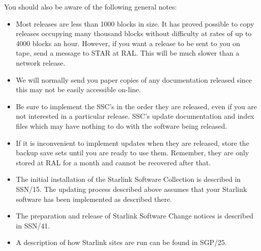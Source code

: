 You should also be aware of the following general notes:
\begin{itemize}
\item Most releases are less than 1000 blocks in size. 
It has proved possible to copy releases occupying many thousand blocks without
difficulty at rates of up to 4000 blocks an hour.
However, if you want a release to be sent to you on tape, send a message to
STAR at RAL.
This will be much slower than a network release.
\item We will normally send you paper copies of any documentation released since
this may not be easily accessible on-line.
\item Be sure to implement the SSC's in the order they are released, even if
you are not interested in a particular release.
SSC's update documentation and index files which may have nothing to do with the
software being released.
\item If it is inconvenient to implement updates when they are released,
store the backup save sets until you are ready to use them.
Remember, they are only stored at RAL for a month and cannot be recovered after
that.
\item The initial installation of the Starlink Software Collection is
described in SSN/15.
The updating process described above assumes that your Starlink software has
been implemented as described there.
\item The preparation and release of Starlink Software Change notices is
described in SSN/41.
\item A description of how Starlink sites are run can be found in SGP/25.
\end{itemize}

